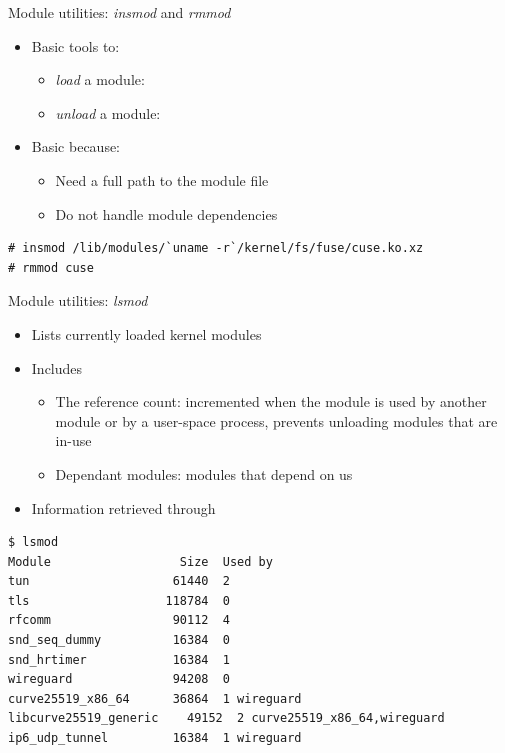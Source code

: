 \begin{frame}[fragile]{Module utilities: {\em insmod} and {\em rmmod}}
  \begin{itemize}
  \item Basic tools to:
    \begin{itemize}
    \item {\em load} a module: 
    \item {\em unload} a module: 
    \end{itemize}
  \item Basic because:
    \begin{itemize}
    \item Need a full path to the module  file
    \item Do not handle module dependencies
    \end{itemize}
  \end{itemize}

  \begin{block}{}
    {\tiny
\begin{verbatim}
# insmod /lib/modules/`uname -r`/kernel/fs/fuse/cuse.ko.xz
# rmmod cuse
\end{verbatim}
    }
  \end{block}
\end{frame}

\begin{frame}[fragile]{Module utilities: {\em lsmod}}

  \begin{itemize}
  \item Lists currently loaded kernel modules
  \item Includes
    \begin{itemize}
    \item The reference count: incremented when the module is used by
      another module or by a user-space process, prevents unloading
      modules that are in-use
    \item Dependant modules: modules that depend on us
    \end{itemize}
  \item Information retrieved through 
  \end{itemize}

  \begin{block}{}
    {\tiny
\begin{verbatim}
$ lsmod
Module                  Size  Used by
tun                    61440  2
tls                   118784  0
rfcomm                 90112  4
snd_seq_dummy          16384  0
snd_hrtimer            16384  1
wireguard              94208  0
curve25519_x86_64      36864  1 wireguard
libcurve25519_generic    49152  2 curve25519_x86_64,wireguard
ip6_udp_tunnel         16384  1 wireguard
\end{verbatim}
    }
  \end{block}
\end{frame}

